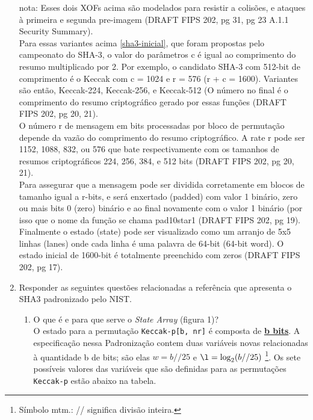 \documentclass[12pt, a4paper]{article}
\begin{document}
\begin{enumerate}
\item[\color{Aquamarine} nota:] Esses dois XOFs acima são modelados para
resistir a colisões, e ataques à primeira e segunda pre-imagem (DRAFT FIPS 202,
pg 31, pg 23 A.1.1 Security Summary).\\

Para essas variantes acima \ref{sha3-inicial}, que foram propostas pelo
campeonato do SHA-3, o valor do parâmetros c é igual ao comprimento do resumo
multiplicado por 2. Por exemplo, o candidato SHA-3 com 512-bit de comprimento é
o Keccak com c = 1024 e r = 576 (r + c = 1600). Variantes são então, Keccak-224,
Keccak-256, e Keccak-512 (O número no final é o comprimento do resumo
criptográfico gerado por essas funções (DRAFT FIPS 202, pg 20, 21).\\

O número r de mensagem em bits processadas por bloco de permutação depende da
vazão do comprimento do resumo criptográfico. A rate r pode ser 1152, 1088, 832,
ou 576 que bate respectivamente com os tamanhos de resumos criptográficos 224,
256, 384, e 512 bits (DRAFT FIPS 202, pg 20, 21).\\

Para assegurar que a mensagem pode ser dividida corretamente em blocos de
tamanho igual a r-bits, e será enxertado (padded) com valor 1 binário, zero ou
mais bits 0 (zero) binário e ao final novamente com o valor 1 binário (por isso
que o nome da função se chama pad10star1 (DRAFT FIPS 202, pg 19).\\

Finalmente o estado (state) pode ser visualizado como um arranjo de 5x5 linhas
(lanes) onde cada linha é uma palavra de 64-bit (64-bit word). O estado inicial
de 1600-bit é totalmente preenchido com zeros (DRAFT FIPS 202, pg 17).\\

\item Responder as seguintes questões relacionadas a referência\cite{nist} que
apresenta o SHA3 padronizado pelo NIST.\\

\begin{enumerate}

\item O que é e para que serve o \textit{State Array} (figura 1)?\\

O estado para a permutação \verb|Keccak-p[b, nr]| é composta de
\textbf{\underline{b bits}}. A especificação nessa Padronização contem duas
variáveis novas relacionadas à quantidade b de bits; são elas $w = b // 25$ e
$\l = \log_2(b//25)$ \footnote{Símbolo mtm.: // significa divisão inteira.}. Os
sete possíveis valores das variáveis que são definidas para as permutações
\verb|Keccak-p| estão abaixo na tabela.


\end{enumerate}
\end{enumerate}
\end{document}
